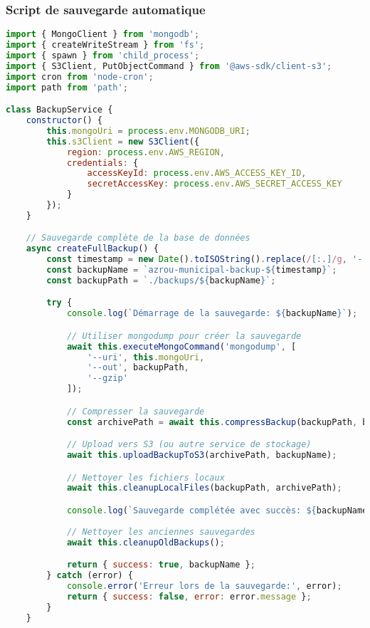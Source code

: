 \subsubsection{Script de sauvegarde automatique}

\begin{lstlisting}[language=JavaScript, caption=backup-script.js]
import { MongoClient } from 'mongodb';
import { createWriteStream } from 'fs';
import { spawn } from 'child_process';
import { S3Client, PutObjectCommand } from '@aws-sdk/client-s3';
import cron from 'node-cron';
import path from 'path';

class BackupService {
    constructor() {
        this.mongoUri = process.env.MONGODB_URI;
        this.s3Client = new S3Client({
            region: process.env.AWS_REGION,
            credentials: {
                accessKeyId: process.env.AWS_ACCESS_KEY_ID,
                secretAccessKey: process.env.AWS_SECRET_ACCESS_KEY
            }
        });
    }

    // Sauvegarde complète de la base de données
    async createFullBackup() {
        const timestamp = new Date().toISOString().replace(/[:.]/g, '-');
        const backupName = `azrou-municipal-backup-${timestamp}`;
        const backupPath = `./backups/${backupName}`;

        try {
            console.log(`Démarrage de la sauvegarde: ${backupName}`);

            // Utiliser mongodump pour créer la sauvegarde
            await this.executeMongoCommand('mongodump', [
                '--uri', this.mongoUri,
                '--out', backupPath,
                '--gzip'
            ]);

            // Compresser la sauvegarde
            const archivePath = await this.compressBackup(backupPath, backupName);

            // Upload vers S3 (ou autre service de stockage)
            await this.uploadBackupToS3(archivePath, backupName);

            // Nettoyer les fichiers locaux
            await this.cleanupLocalFiles(backupPath, archivePath);

            console.log(`Sauvegarde complétée avec succès: ${backupName}`);
            
            // Nettoyer les anciennes sauvegardes
            await this.cleanupOldBackups();

            return { success: true, backupName };
        } catch (error) {
            console.error('Erreur lors de la sauvegarde:', error);
            return { success: false, error: error.message };
        }
    }


\end{lstlisting}

